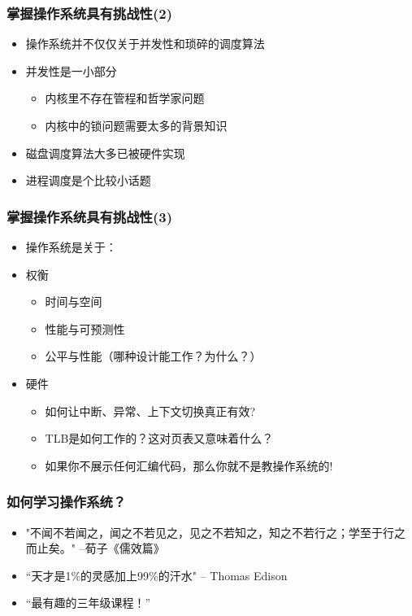 \documentclass[UTF8]{ctexbeamer}
\begin{document}
    
\begin{frame}
    \frametitle{掌握操作系统具有挑战性(2)}
    \begin{itemize}
        \item 操作系统并不仅仅关于并发性和琐碎的调度算法
        \item 并发性是一小部分
            \begin{itemize}
                \item 内核里不存在管程和哲学家问题
                \item 内核中的锁问题需要太多的背景知识
            \end{itemize}
        \item 磁盘调度算法大多已被硬件实现
        \item 进程调度是个比较小话题
    \end{itemize}
\end{frame}

    
\begin{frame}
    \frametitle{掌握操作系统具有挑战性(3)}
    \begin{itemize}
        \item 操作系统是关于：
        \item 权衡
            \begin{itemize}
                \item 时间与空间
                \item 性能与可预测性
                \item 公平与性能（哪种设计能工作？为什么？）
            \end{itemize}
        \item 硬件
            \begin{itemize}
                \item 如何让中断、异常、上下文切换真正有效? 
                \item TLB是如何工作的？这对页表又意味着什么？
                \item 如果你不展示任何汇编代码，那么你就不是教操作系统的!
            \end{itemize}
    \end{itemize}
\end{frame}

    
\begin{frame}
    \frametitle{如何学习操作系统？}
    \begin{itemize}
        \item "不闻不若闻之，闻之不若见之，见之不若知之，知之不若行之；学至于行之而止矣。" --荀子《儒效篇》 
        \item “天才是1\%的灵感加上99\%的汗水"  -- Thomas Edison 
        \item “最有趣的三年级课程！”
    \end{itemize}
\end{frame}

\end{document}

